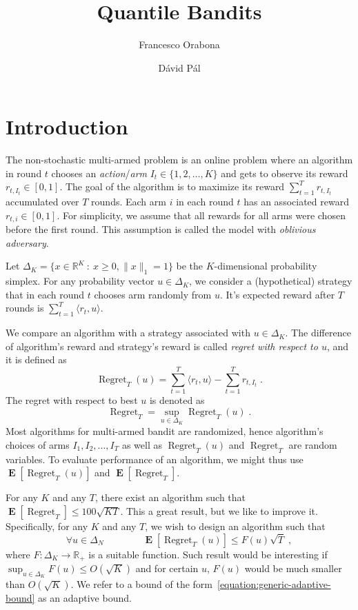 \documentclass[12pt]{article}
\newcommand{\R}{\mathbb{R}}
\newcommand{\norm}[1]{\|#1\|}
\DeclareMathOperator{\Regret}{Regret}
\DeclareMathOperator{\Exp}{\mathbf{E}}
\begin{document}
\title{Quantile Bandits}
\author{Francesco Orabona \and D\'avid P\'al}

\maketitle

\section{Introduction}

The non-stochastic multi-armed problem is an online problem where an algorithm
in round $t$ chooses an \emph{action}/\emph{arm} $I_t \in \{1,2,\dots,K\}$ and
gets to observe its reward $r_{t,I_t} \in [0,1]$. The goal of the algorithm is
to maximize its reward $\sum_{t=1}^T r_{t,I_t}$ accumulated over $T$ rounds.
Each arm $i$ in each round $t$ has an associated reward $r_{t,i} \in [0,1]$.
For simplicity, we assume that all rewards for all arms were chosen before the
first round. This assumption is called the model with \emph{oblivious
adversary}.

Let $\Delta_K = \{ x \in \R^K ~:~ x \ge 0, \norm{x}_1 = 1 \}$ be the
$K$-dimensional probability simplex. For any probability vector $u \in
\Delta_K$, we consider a (hypothetical) strategy that in each round $t$ chooses
arm randomly from $u$. It's expected reward after $T$ rounds is $\sum_{t=1}^T
\langle r_t, u \rangle$.

We compare an algorithm with a strategy associated with $u \in \Delta_K$.
The difference of algorithm's reward and strategy's reward is called \emph{regret
with respect to $u$}, and it is defined as
$$
\Regret_T(u) = \sum_{t=1}^T \langle r_t, u \rangle - \sum_{t=1}^T r_{t,I_t} \; .
$$
The regret with respect to best $u$ is denoted as
$$
\Regret_T =  \sup_{u \in \Delta_K} \Regret_T(u) \; .
$$
Most algorithms for multi-armed bandit are randomized, hence algorithm's
choices of arms $I_1, I_2, \dots, I_T$ as well as $\Regret_T(u)$ and
$\Regret_T$ are random variables. To evaluate performance of an algorithm,
we might thus use $\Exp[\Regret_T(u)]$ and $\Exp[\Regret_T]$.

For any $K$ and any $T$, there exist an algorithm such that $\Exp[\Regret_T] \le
100 \sqrt{KT}$. This a great result, but we like to improve it. Specifically,
for any $K$ and any $T$, we wish to design an algorithm such that
\begin{equation}
\label{equation:generic-adaptive-bound}
\forall u \in \Delta_N \qquad \qquad \Exp[\Regret_T(u)] \le F(u) \sqrt{T} \; ,
\end{equation}
where $F:\Delta_K \to \R_+$ is a suitable function. Such result would be
interesting if $\sup_{u \in \Delta_K} F(u) \le O(\sqrt{K})$ and for certain
$u$, $F(u)$ would be much smaller than $O(\sqrt{K})$. We refer to a bound of the
form~\eqref{equation:generic-adaptive-bound} as an adaptive bound.
\end{document}
